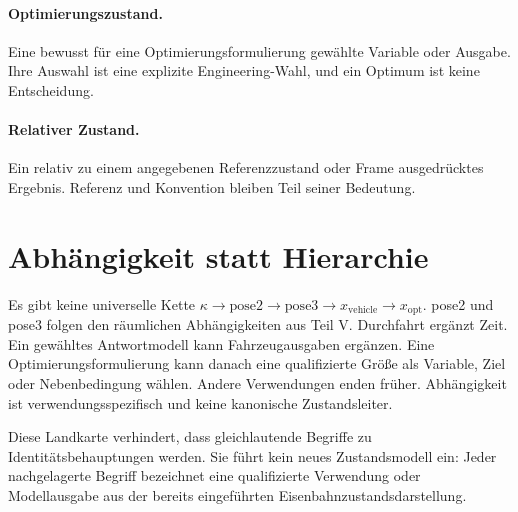 \paragraph{Optimierungszustand.}
\label{def:taxonomy-optimization-state}
Eine bewusst für eine Optimierungsformulierung gewählte Variable oder Ausgabe.
Ihre Auswahl ist eine explizite Engineering-Wahl, und ein Optimum ist keine
Entscheidung.

\paragraph{Relativer Zustand.}
\label{def:taxonomy-relative-state}
Ein relativ zu einem angegebenen Referenzzustand oder Frame ausgedrücktes
Ergebnis. Referenz und Konvention bleiben Teil seiner Bedeutung.

\section{Abhängigkeit statt Hierarchie}

Es gibt keine universelle Kette
\(\kappa\rightarrow\mathrm{pose2}\rightarrow\mathrm{pose3}\rightarrow
x_{\mathrm{vehicle}}\rightarrow x_{\mathrm{opt}}\).
pose2 und pose3 folgen den räumlichen Abhängigkeiten aus Teil V. Durchfahrt
ergänzt Zeit. Ein gewähltes Antwortmodell kann Fahrzeugausgaben ergänzen. Eine
Optimierungsformulierung kann danach eine qualifizierte Größe als Variable,
Ziel oder Nebenbedingung wählen. Andere Verwendungen enden früher.
Abhängigkeit ist verwendungsspezifisch und keine kanonische Zustandsleiter.

\begin{summary}
Diese Landkarte verhindert, dass gleichlautende Begriffe zu
Identitätsbehauptungen werden. Sie führt kein neues Zustandsmodell ein: Jeder
nachgelagerte Begriff bezeichnet eine qualifizierte Verwendung oder
Modellausgabe aus der bereits eingeführten Eisenbahnzustandsdarstellung.
\end{summary}
